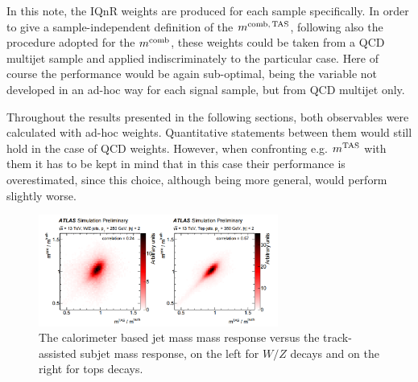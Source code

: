 
In this note, the IQnR weights are produced for each sample specifically. In order to give a sample-independent definition of the $m^\textrm{comb,\,TAS}$, following also the procedure adopted for the $m^\textrm{comb}$, these weights could be taken from a QCD multijet sample and applied indiscriminately to the particular case. Here of course the performance would be again sub-optimal, being the variable not developed in an ad-hoc way for each signal sample, but from QCD multijet only.

Throughout the results presented in the following sections, both observables were calculated with ad-hoc weights. Quantitative statements between them would still hold in the case of QCD weights. However, when confronting e.g. $\mtas$ with them it has to be kept in mind that in this case their performance is overestimated, since this choice, although being more general, would perform slightly worse.

\begin{figure}[!ht]
  \centering
      \includegraphics[width=0.7\textwidth]{jet_part/mcomb/mcomb2.png}
  \caption[$\mcal$ and $\mtas$ correlation plots]{The calorimeter based jet mass mass response versus the track-assisted subjet mass response, on the left for $W/Z$ decays and on the right for tops decays.}
  \label{fig:mcomb2}
\end{figure}



